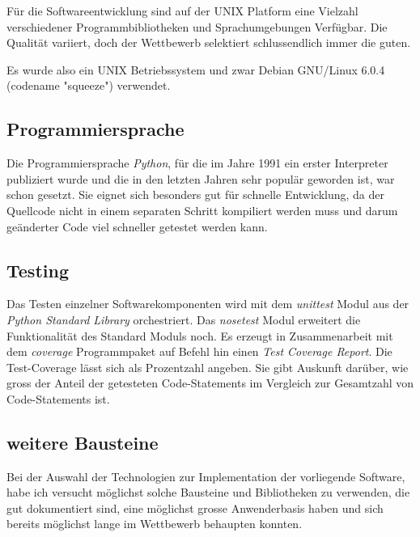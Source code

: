 \documentclass[a4paper]{thesis}
\begin{document}
Für die Softwareentwicklung sind auf der UNIX Platform
eine Vielzahl verschiedener Programmbibliotheken und Sprachumgebungen
Verfügbar. Die Qualität variiert, doch der Wettbewerb selektiert
schlussendlich immer die guten.

Es wurde also ein UNIX Betriebssystem und zwar Debian GNU/Linux 6.0.4
(codename "squeeze") verwendet.

\subsection{Programmiersprache}

Die Programmiersprache {\em Python}, für die im Jahre 1991 ein erster
Interpreter publiziert wurde und die in den letzten Jahren sehr
populär geworden ist, war schon gesetzt. Sie eignet sich besonders gut
für schnelle Entwicklung, da der
Quellcode nicht in einem separaten Schritt kompiliert werden muss und
darum geänderter Code viel schneller getestet werden kann.

\subsection{Testing}

Das Testen einzelner Softwarekomponenten wird mit dem {\em unittest} Modul
aus der {\em Python Standard Library} orchestriert. Das {\em nosetest}
Modul erweitert die Funktionalität des Standard Moduls noch.
Es erzeugt in Zusammenarbeit mit dem {\em coverage}
Programmpaket auf Befehl hin einen {\em Test Coverage Report}. Die
Test-Coverage lässt sich als Prozentzahl angeben. Sie gibt Auskunft darüber,
wie gross der Anteil der getesteten Code-Statements im Vergleich zur Gesamtzahl
von Code-Statements ist.

\subsection{weitere Bausteine}

Bei der Auswahl der Technologien zur
Implementation der vorliegende Software,
habe ich versucht möglichst solche Bausteine und Bibliotheken
zu verwenden, die gut dokumentiert sind, eine möglichst grosse Anwenderbasis
haben und sich bereits möglichst lange im Wettbewerb behaupten konnten.
\end{document}
